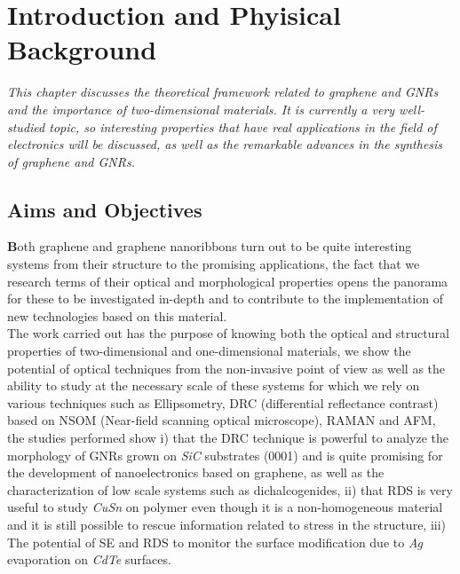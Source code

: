 \chapter{Introduction and Phyisical Background}
\label{Introduction and Phyisical Background }
\textit{This chapter discusses the theoretical framework related to graphene and GNRs and the importance of two-dimensional materials. It is currently a very well-studied topic, so interesting properties that have real applications in the field of electronics will be discussed, as well as the remarkable advances in the synthesis of graphene and GNRs.
}
\vfill
\minitoc\newpage


\section{Aims and Objectives}
\vspace{-1cm}
\lettrine[lines=3, lraise=0.1, nindent=0mm, slope=0mm]{\textbf{B}}{}oth graphene and graphene nanoribbons turn out to be quite interesting systems from their structure to the promising applications, the fact that we research terms of their optical and morphological properties opens the panorama for these to be investigated in-depth and to contribute to the implementation of new technologies based on this material. \\

The work carried out has the purpose of knowing both the optical and structural properties of two-dimensional and one-dimensional materials, we show the potential of optical techniques from the non-invasive point of view as well as the ability to study at the necessary scale of these systems for which we rely on various techniques such as Ellipsometry, DRC (differential reflectance contrast) based on NSOM (Near-field scanning optical microscope), RAMAN and AFM, the studies performed show i) that the DRC technique is powerful to analyze the morphology of GNRs grown on \textit{SiC} substrates (0001) and is quite promising for the development of nanoelectronics based on graphene, as well as the characterization of low scale systems such as dichalcogenides, ii) that RDS is very useful to study \textit{CuSn} on polymer even though it is a non-homogeneous material and it is still possible to rescue information related to stress in the structure, iii) The potential of SE and RDS to monitor the surface modification due to \textit{Ag} evaporation on \textit{CdTe} surfaces. 

